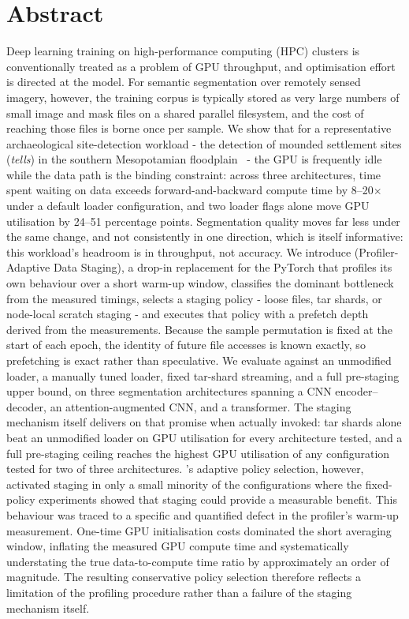 \section*{Abstract}

Deep learning training on high-performance computing (HPC) clusters is conventionally
treated as a problem of GPU throughput, and optimisation effort is directed
at the model.
For semantic segmentation over remotely sensed imagery, however, the training corpus
is typically stored as very large numbers of small image and mask files on a shared
parallel filesystem, and the cost of reaching those files is borne once per sample.
%
We show that for a representative archaeological site-detection workload
- the detection of mounded settlement sites (\emph{tells}) in the southern
Mesopotamian floodplain~\cite{Casini23} -
the GPU is frequently idle while the data path is the binding constraint:
across three architectures, time spent waiting on data exceeds forward-and-backward
compute time by 8--20$\times$ under a default loader configuration, and two loader
flags alone move GPU utilisation by 24--51 percentage points. Segmentation quality
moves far less under the same change, and not consistently in one direction, which
is itself informative: this workload's headroom is in throughput, not accuracy.
%
We introduce \pads{} (Profiler-Adaptive Data Staging), a drop-in replacement for the
PyTorch  that profiles its own behaviour over a short warm-up window,
classifies the dominant bottleneck from the measured timings, selects a staging policy
- loose files, tar shards, or node-local scratch staging - and executes that policy
with a prefetch depth derived from the measurements.
%
Because the sample permutation is fixed at the start of each epoch, the identity of
future file accesses is known exactly, so prefetching is exact rather than speculative.
%
We evaluate \pads{} against an unmodified loader, a manually tuned loader, fixed
tar-shard streaming, and a full pre-staging upper bound, on three segmentation
architectures spanning a CNN encoder--decoder, an attention-augmented CNN, and a
transformer.
The staging mechanism itself delivers on that promise when actually invoked: tar
shards alone beat an unmodified loader on GPU utilisation for every architecture
tested, and a full pre-staging ceiling reaches the highest GPU utilisation of any
configuration tested for two of three architectures. \pads{}'s adaptive policy selection, however, activated staging in only a small minority of the configurations where the fixed-policy experiments showed that staging could provide a measurable benefit. This behaviour was traced to a specific and quantified defect in the profiler's warm-up measurement. One-time GPU initialisation costs dominated the short averaging window, inflating the measured GPU compute time and systematically understating the true data-to-compute time ratio by approximately an order of magnitude. The resulting conservative policy selection therefore reflects a limitation of the profiling procedure rather than a failure of the staging mechanism itself.
